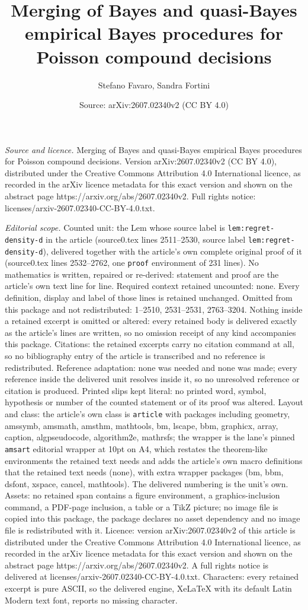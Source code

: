 \documentclass[10pt,a4paper]{amsart}
\title[Merging of Bayes and quasi-Bayes empirical Bayes procedures ]{Merging of Bayes and quasi-Bayes empirical Bayes procedures for Poisson compound decisions}
\author{Stefano Favaro, Sandra Fortini}
\date{Source: arXiv:2607.02340v2 (CC BY 4.0)}
\begin{document}
\maketitle

\noindent\emph{Source and licence.} Merging of Bayes and quasi-Bayes empirical Bayes procedures for Poisson compound decisions. Version arXiv:2607.02340v2 (CC BY 4.0), distributed under the Creative Commons Attribution 4.0 International licence, as recorded in the arXiv licence metadata for this exact version and shown on the abstract page https://arxiv.org/abs/2607.02340v2. Full rights notice: licenses/arxiv-2607.02340-CC-BY-4.0.txt.\par\smallskip

\noindent\textit{Editorial scope.} Counted unit: the Lem whose source label is \texttt{lem:regret-density-d} in the article (source0.tex lines 2511--2530, source label \texttt{lem:regret-density-d}), delivered together with the article's own complete original proof of it (source0.tex lines 2532--2762, one \texttt{proof} environment of 231 lines). No mathematics is written, repaired or re-derived: statement and proof are the article's own text line for line. Required context retained uncounted: none. Every definition, display and label of those lines is retained unchanged. Omitted from this package and not redistributed: 1--2510, 2531--2531, 2763--3204. Nothing inside a retained excerpt is omitted or altered: every retained body is delivered exactly as the article's lines are written, so no omission receipt of any kind accompanies this package. Citations: the retained excerpts carry no citation command at all, so no bibliography entry of the article is transcribed and no reference is redistributed. Reference adaptation: none was needed and none was made; every reference inside the delivered unit resolves inside it, so no unresolved reference or citation is produced. Printed slips kept literal: no printed word, symbol, hypothesis or number of the counted statement or of its proof was altered. Layout and class: the article's own class is \texttt{article} with packages including geometry, amssymb, amsmath, amsthm, mathtools, bm, lscape, bbm, graphicx, array, caption, algpseudocode, algorithm2e, mathrsfs; the wrapper is the lane's pinned \texttt{amsart} editorial wrapper at 10pt on A4, which restates the theorem-like environments the retained text needs and adds the article's own macro definitions that the retained text needs (none), with extra wrapper packages (bm, bbm, dsfont, xspace, cancel, mathtools). The delivered numbering is the unit's own. Assets: no retained span contains a figure environment, a graphics-inclusion command, a PDF-page inclusion, a table or a TikZ picture; no image file is copied into this package, the package declares no asset dependency and no image file is redistributed with it. Licence: version arXiv:2607.02340v2 of this article is distributed under the Creative Commons Attribution 4.0 International licence, as recorded in the arXiv licence metadata for this exact version and shown on the abstract page https://arxiv.org/abs/2607.02340v2. A full rights notice is delivered at licenses/arxiv-2607.02340-CC-BY-4.0.txt. Characters: every retained excerpt is pure ASCII, so the delivered engine, XeLaTeX with its default Latin Modern text font, reports no missing character.
\end{document}
